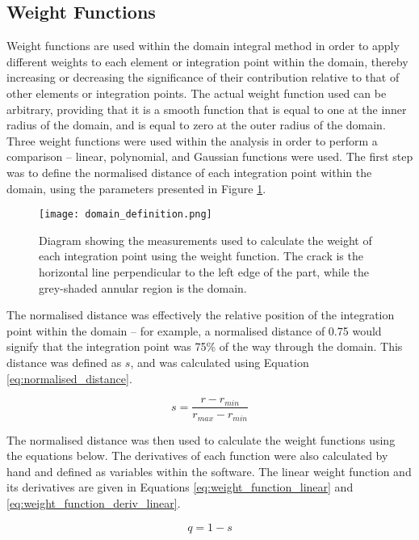 \subsection{Weight Functions}\label{sec:weight_functions}

Weight functions are used within the domain integral method in order to apply different weights to each element or integration point within the domain, thereby increasing or decreasing the significance of their contribution relative to that of other elements or integration points. The actual weight function used can be arbitrary, providing that it is a smooth function that is equal to one at the inner radius of the domain, and is equal to zero at the outer radius of the domain. Three weight functions were used within the analysis in order to perform a comparison -- linear, polynomial, and Gaussian functions were used. The first step was to define the normalised distance of each integration point within the domain, using the parameters presented in Figure \ref{fig:domain_definition}.

\begin{figure}[H]
	\centering
	\texttt{[image: domain\_definition.png]}
	\caption{Diagram showing the measurements used to calculate the weight of each integration point using the weight function. The crack is the horizontal line perpendicular to the left edge of the part, while the grey-shaded annular region is the domain.}
	\label{fig:domain_definition}
\end{figure}

The normalised distance was effectively the relative position of the integration point within the domain -- for example, a normalised distance of 0.75 would signify that the integration point was 75\% of the way through the domain. This distance was defined as $s$, and was calculated using Equation \ref{eq:normalised_distance}.

\begin{equation}\label{eq:normalised_distance}
	s = \frac{r - r_{min}}{r_{max} - r_{min}}
\end{equation}

The normalised distance was then used to calculate the weight functions using the equations below. The derivatives of each function were also calculated by hand and defined as variables within the software. The linear weight function and its derivatives are given in Equations \ref{eq:weight_function_linear} and \ref{eq:weight_function_deriv_linear}.

\begin{equation}\label{eq:weight_function_linear}
	q = 1 - s
\end{equation}

